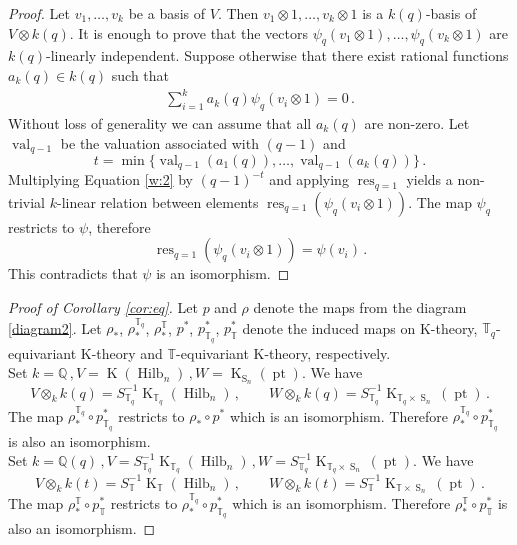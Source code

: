 \documentclass[12pt,a4paper]{amsart}
\theoremstyle{plain}
\theoremstyle{definition}
\theoremstyle{remark}
\newcommand{\Hilb}[1]{\operatorname{Hilb}_{{#1}}}
\newcommand{\Perm}{\operatorname{S}}
\newcommand{\pt}{\operatorname{pt}}
\newcommand{\res}{\operatorname{res}}
\newcommand{\val}{\operatorname{val}}
\newcommand{\QQ}{\mathbb{Q}}
\newcommand{\TT}{\mathbb{T}}
\newcommand{\Tq}{{\mathbb{T}_q}}
\DeclareMathOperator{\KTh}{K}
\begin{document}
\begin{proof}
	Let $v_1,\dots,v_k$ be a basis of $V$. Then $v_1\otimes 1,\dots,v_k\otimes 1$ is a $k(q)$-basis of $V\otimes k(q)$. It is enough to prove that the vectors $\psi_q(v_1\otimes 1),\dots,\psi_q(v_k\otimes 1)$ are $k(q)$-linearly independent. Suppose otherwise that there exist rational functions $a_k(q) \in k(q)$ such that
	\begin{align} \label{w:2}
		\sum_{i=1}^{k} a_k(q)\psi_q(v_i\otimes 1)=0\,. 
	\end{align}
	Without loss of generality we can assume that all $a_k(q)$ are non-zero. Let $\val_{q-1}$ be the valuation associated with $(q-1)$ and
	$$
	t=\min\{\val_{q-1}(a_1(q)), \dots, \val_{q-1}(a_k(q))\}\,.
	$$
	 Multiplying Equation \eqref{w:2} by $(q-1)^{-t}$ and applying $\res_{q=1}$ yields a non-trivial $k$-linear relation between elements $\res_{q=1}(\psi_q(v_i\otimes 1))$. The map $\psi_q$ restricts to  $\psi$, therefore $$\res_{q=1}(\psi_q(v_i\otimes 1))=\psi(v_i)\,.$$ This contradicts that $\psi$ is an  isomorphism.
\end{proof}
\begin{proof} [Proof of Corollary \ref{cor:eq}]
	 Let $p$ and $\rho$ denote the maps from the diagram \eqref{diagram2}. Let $\rho_*$, $\rho^\Tq_*$, $\rho^\TT_*$, $p^*$, $p^*_\Tq$, $p^*_\TT$ denote the induced maps on K-theory, $\Tq$-equivariant K-theory and $\TT$-equivariant K-theory, respectively. \\
	 Set $k=\QQ\,, V=\KTh(\Hilb{n})\,, W=\KTh_{\Perm_n}(\pt)$. We have
	 $$V\otimes_k k(q)=S^{-1}_\Tq\KTh_{\Tq}(\Hilb{n})\,, \qquad W\otimes_k k(q)=S^{-1}_\Tq\KTh_{\Tq\times\Perm_n}(\pt)\,. $$
	 The  map $\rho^{\Tq}_*\circ p_{\Tq}^*$ restricts to $\rho_*\circ p^*$ which is an isomorphism. Therefore $\rho^{\Tq}_*\circ p_{\Tq}^*$ is also an isomorphism. \\
	 Set $k=\QQ(q)\,, V=S^{-1}_\Tq\KTh_{\Tq}(\Hilb{n})\,, W=S^{-1}_\Tq\KTh_{\Tq\times\Perm_n}(\pt)$. We have
	 $$V\otimes_k k(t)=S^{-1}_\TT\KTh_{\TT}(\Hilb{n})\,, \qquad W\otimes_k k(t)=S^{-1}_\TT\KTh_{\TT\times\Perm_n}(\pt)\,. $$
	 The  map $\rho^{\TT}_*\circ p_{\TT}^*$ restricts to $\rho^{\Tq}_*\circ p_{\Tq}^*$ which is an isomorphism. Therefore $\rho^{\TT}_*\circ p_{\TT}^*$ is also an isomorphism.
\end{proof}

%
% 
\end{document}
